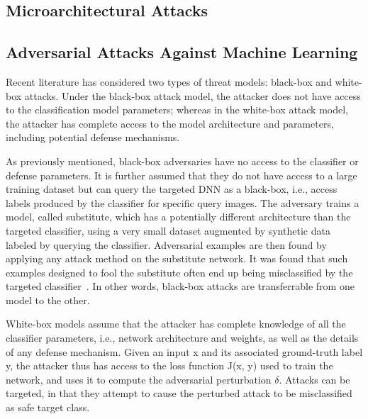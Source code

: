 
\subsection{Microarchitectural Attacks}

\subsection{Adversarial Attacks Against Machine Learning}

Recent literature has considered two types of threat models: black-box and white-box attacks. Under the black-box attack model, the attacker does not have access to the classification model parameters; whereas in the white-box attack model, the attacker has complete access to the model architecture and parameters, including potential defense mechanisms.




As previously mentioned, black-box adversaries have no access to the classifier
or defense parameters. It is further assumed that they do not have access to a large training dataset
but can query the targeted DNN as a black-box, i.e., access labels produced by the classifier for
specific query images. The adversary trains a model, called substitute, which has a potentially
different architecture than the targeted classifier, using a very small dataset augmented by synthetic
data labeled by querying the classifier. Adversarial examples are then found by applying any
attack method on the substitute network. It was found that such examples designed to fool the substitute often end up being misclassified by the targeted classifier~\cite{szegedy2014going, papernot2017practical}. In other words, black-box attacks are  transferrable from one model to the other. 

White-box models assume that the attacker has complete knowledge of all the classifier parameters, i.e., network architecture and weights, as well as the details of any defense mechanism. Given an input x and its associated ground-truth label y, the attacker thus has access to the loss function J(x, y) used to train the network, and uses it to compute the adversarial perturbation $\delta$. Attacks can be targeted, in that they attempt to cause the perturbed attack to be misclassified as safe target class. 

